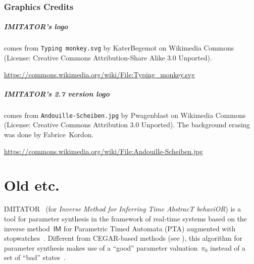 \documentclass[a4paper,11pt]{report}
\newcommand{\pio}{\pi_0}
\newcommand{\IM}{\ensuremath{\mathsf{IM}}}
\newcommand{\imitator}{\textsf{IMITATOR}}
\newcommand{\stylePath}[1]{\textcolor{pathcolor}{\texttt{#1}}}
\begin{document}
\bigskip

\subsection*{Graphics Credits}

\paragraph{\imitator{}'s logo} comes from \stylePath{Typing monkey.svg} by KaterBegemot on Wikimedia Commons
	(License: Creative Commons Attribution-Share Alike 3.0 Unported).

\url{https://commons.wikimedia.org/wiki/File:Typing_monkey.svg}


\paragraph{\imitator{}'s 2.7 version logo} comes from  \stylePath{Andouille-Scheiben.jpg} by Pwagenblast on Wikimedia Commons
	(License: Creative Commons Attribution 3.0 Unported).
The background erasing was done by Fabrice~Kordon.

\url{https://commons.wikimedia.org/wiki/File:Andouille-Scheiben.jpg}



\newpage




\ifdefined\DraftVersion

\chapter{Old etc.}


\imitator{}~\cite{AFKS12} (for \emph{Inverse Method for Inferring Time AbstracT behaviOR}) is a tool for parameter synthesis in the framework of real-time systems based on the inverse method~$\IM$ for Parametric Timed Automata (PTA) augmented with stopwatches~\cite{AHV93,AM02}.
Different from CEGAR-based methods (see \cite{cgjlv00}), this algorithm for parameter synthesis makes use of a ``good'' parameter valuation~$\pio$ instead of a set of ``bad'' states~\cite{AS13}.
\end{document}
